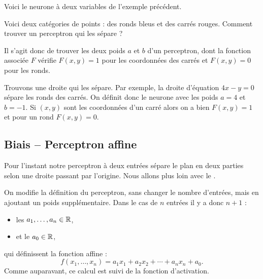 
Voici le neurone à deux variables de l'exemple précédent.

\begin{exemple}{}{}
	Voici deux catégories de points : des ronds bleus et des carrés rouges. Comment trouver un perceptron qui les sépare ?
	
	
	Il s'agit donc de trouver les deux poids $a$ et $b$ d'un perceptron, dont la fonction associée
	$F$ vérifie $F(x,y)=1$ pour les coordonnées des carrés et $F(x,y)=0$ pour les ronds.
	
	
	Trouvons une droite qui les sépare. Par exemple, la droite d'équation $4x-y=0$ sépare les ronds des carrés. On définit donc le neurone avec les poids $a=4$ et $b=-1$.
	Si $(x,y)$ sont les coordonnées d'un carré alors on a bien $F(x,y)=1$ et pour un rond $F(x,y)=0$.
	
	\begin{center}
		\begin{minipage}{0.35\textwidth}
		\end{minipage}
		\begin{minipage}{0.45\textwidth}
		\end{minipage}
	\end{center}
	
	
\end{exemple}

\subsection{Biais -- Perceptron affine}

Pour l'instant notre perceptron à deux entrées sépare le plan en deux parties selon une droite passant par l'origine.
Nous allons plus loin avec le  .

On modifie la définition du perceptron, sans changer le nombre d'entrées, mais en ajoutant un poids supplémentaire.
Dans le cas de $n$ entrées il y  a donc $n+1$   : 
\begin{itemize} 
	\item les   $a_1,\ldots,a_n \in \mathbb{R}$,
	\item et le   $a_0 \in \mathbb{R}$,
\end{itemize}
qui définissent la fonction affine :
$$f(x_1,\ldots,x_n) = a_1 x_1 + a_2 x_2 + \cdots + a_n x_n + a_0.$$
Comme auparavant, ce calcul est suivi de la fonction d'activation.


